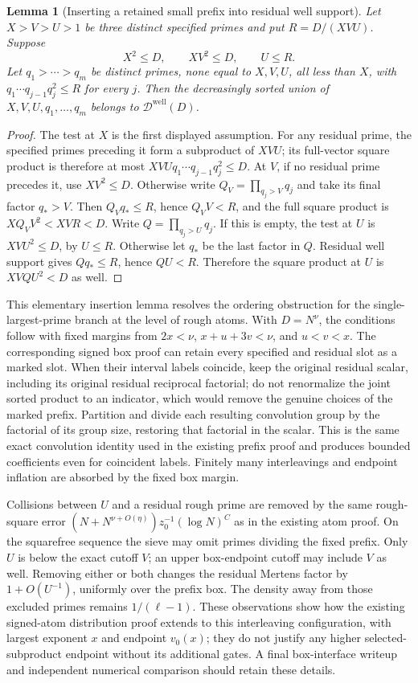 \documentclass[11pt]{article}
\newtheorem{lemma}[theorem]{Lemma}
\begin{document}
\begin{lemma}[Inserting a retained small prefix into residual well support]
Let $X>V>U>1$ be three distinct specified primes and put
$R=D/(XVU)$.  Suppose
\[
 X^2\le D,\qquad XV^2\le D,\qquad U\le R.
\]
Let $q_1>\cdots>q_m$ be distinct primes, none equal to $X,V,U$,
all less than $X$, with
$q_1\cdots q_{j-1}q_j^2\le R$ for every $j$.
Then the decreasingly sorted union of $X,V,U,q_1,\ldots,q_m$
belongs to $\mathcal D^{\mathrm{well}}(D)$.
\end{lemma}

\begin{proof}
The test at $X$ is the first displayed assumption.
For any residual prime, the specified primes preceding it form a
subproduct of $XVU$; its full-vector square product is therefore at
most $XVUq_1\cdots q_{j-1}q_j^2\le D$.
At $V$, if no residual prime precedes it, use $XV^2\le D$.
Otherwise write $Q_V=\prod_{q_j>V}q_j$ and take its final factor
$q_*>V$.  Then $Q_Vq_*\le R$, hence $Q_VV<R$, and the full square
product is $XQ_VV^2<XVR<D$.
Write $Q=\prod_{q_j>U}q_j$.  If this is empty, the test at $U$
is $XVU^2\le D$, by $U\le R$.
Otherwise let $q_*$ be the last factor in $Q$.  Residual well support
gives $Qq_*\le R$, hence $QU<R$.  Therefore the square product at
$U$ is $XVQU^2<D$ as well.
\end{proof}

This elementary insertion lemma resolves the ordering obstruction
for the single-largest-prime branch at the level of rough atoms.
With $D=N^\nu$, the conditions follow with fixed margins from
$2x<\nu$, $x+u+3v<\nu$, and $u<v<x$.
The corresponding signed box proof can retain every specified and
residual slot as a marked slot.  When their interval labels coincide,
keep the original residual scalar, including its original residual
reciprocal factorial; do not renormalize the joint sorted product to
an indicator, which would remove the genuine choices of the marked
prefix.  Partition and divide each resulting convolution group by
the factorial of its group size, restoring that factorial in the
scalar.  This is the same exact convolution identity used in the
existing prefix proof and produces bounded coefficients even for
coincident labels.  Finitely many interleavings and endpoint inflation
are absorbed by the fixed box margin.

Collisions between $U$ and a residual rough prime are removed by the
same rough-square error
$(N+N^{\nu+O(\eta)})z_0^{-1}(\log N)^C$
as in the existing atom proof.  On the squarefree sequence the sieve
may omit primes dividing the fixed prefix.  Only $U$ is below the
exact cutoff $V$; an upper box-endpoint cutoff may include $V$ as
well.  Removing either or both changes the residual Mertens factor
by $1+O(U^{-1})$, uniformly over the prefix box.  The density away from
those excluded primes remains $1/(\ell-1)$.  These observations show
how the existing signed-atom distribution proof extends to this
interleaving configuration, with largest exponent $x$ and endpoint
$v_0(x)$; they do not justify any higher selected-subproduct endpoint
without its additional gates.  A final box-interface writeup and
independent numerical comparison should retain these details.
\end{document}
